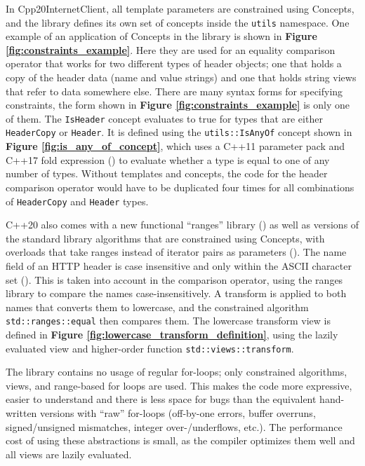\documentclass[12pt, a4paper]{article}
\begin{document}
In Cpp20InternetClient, all template parameters are constrained using Concepts, and the library defines its own set of concepts inside the \texttt{utils} namespace. One example of an application of Concepts in the library is shown in \textbf{Figure \ref{fig:constraints_example}}. Here they are used for an equality comparison operator that works for two different types of header objects; one that holds a copy of the header data (name and value strings) and one that holds string views that refer to data somewhere else. There are many syntax forms for specifying constraints, the form shown in \textbf{Figure \ref{fig:constraints_example}} is only one of them. The \texttt{IsHeader} concept evaluates to true for types that are either \texttt{HeaderCopy} or \texttt{Header}. It is defined using the \texttt{utils::IsAnyOf} concept shown in \textbf{Figure \ref{fig:is_any_of_concept}}, which uses a C++11 parameter pack and C++17 fold expression (\cite{CppFoldExpression}) to evaluate whether a type is equal to one of any number of types. Without templates and concepts, the code for the header comparison operator would have to be duplicated four times for all combinations of \texttt{HeaderCopy} and \texttt{Header} types.

C++20 also comes with a new functional “ranges” library (\cite{CppRanges}) as well as versions of the standard library algorithms that are constrained using Concepts, with overloads that take ranges instead of iterator pairs as parameters (\cite{CppConstrainedAlgorithms}). The name field of an HTTP header is case insensitive and only within the ASCII character set (\cite[][Section 4.2]{HttpSpec}). This is taken into account in the comparison operator, using the ranges library to compare the names case-insensitively. A transform is applied to both names that converts them to lowercase, and the constrained algorithm \texttt{std::ranges::equal} then compares them. The lowercase transform view is defined in \textbf{Figure \ref{fig:lowercase_transform_definition}}, using the lazily evaluated view and higher-order function \texttt{std::views::transform}. 

The library contains no usage of regular for-loops; only constrained algorithms, views, and range-based for loops are used. This makes the code more expressive, easier to understand and there is less space for bugs than the equivalent hand-written versions with “raw” for-loops (off-by-one errors, buffer overruns, signed/unsigned mismatches, integer over-/underflows, etc.). The performance cost of using these abstractions is small, as the compiler optimizes them well and all views are lazily evaluated. 
\end{document}

